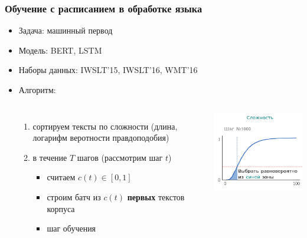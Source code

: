 \documentclass{beamer}
\begin{document}
\begin{frame}
	\frametitle{Обучение с расписанием в обработке языка}		\let\thefootnote\relax{}
	\begin{itemize}
		\item Задача: машинный первод
		\item Модель: BERT, LSTM
		\item Наборы данных: IWSLT'15, IWSLT'16, WMT'16
		\item Алгоритм:
			\begin{columns}
					\begin{enumerate}
						\item сортируем тексты по сложности (длина, логарифм веротности правдоподобия)
						\item в течение $T$ шагов (рассмотрим шаг $t$)
						\begin{itemize}
							\item считаем $c(t) \in [0, 1]$
							\item строим батч из $c(t)$ {\bf первых} текстов корпуса
							\item шаг обучения
						\end{itemize}
					\end{enumerate}
				\includegraphics[scale=0.75]{acl19_algo.png}
			\end{columns}
	\end{itemize}
\end{frame}
\end{document}
